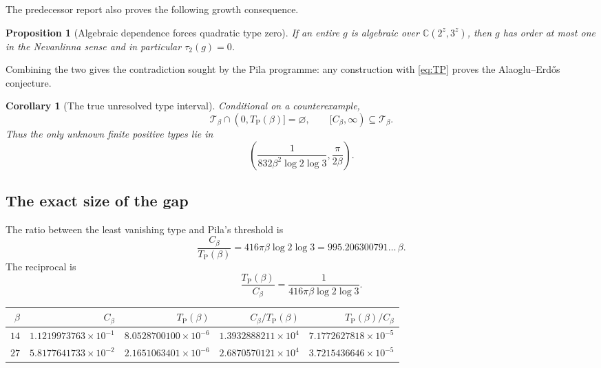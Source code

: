 \documentclass[11pt,oneside]{article}
\newtheorem{proposition}[theorem]{Proposition}
\newtheorem{corollary}[theorem]{Corollary}
\theoremstyle{definition}
\theoremstyle{remark}
\newcommand{\C}{\mathbb C}
\newcommand{\Tclass}{\mathcal T}
\newcommand{\Cbeta}{C_\beta}
\newcommand{\TP}{T_{\mathrm P}(\beta)}
\begin{document}
The predecessor report also proves the following growth consequence.

\begin{proposition}[Algebraic dependence forces quadratic type zero]
\label{prop:algdepzero}
If an entire $g$ is algebraic over $\C(2^z,3^z)$, then $g$ has order at most one in the
Nevanlinna sense and in particular $\tau_2(g)=0$.
\end{proposition}

Combining the two gives the contradiction sought by the Pila programme: any construction
with \eqref{eq:TP} proves the Alaoglu--Erd\H{o}s conjecture.

\begin{corollary}[The true unresolved type interval]
\label{cor:trueinterval}
Conditional on a counterexample,
\begin{equation}
 \Tclass_\beta\cap(0,\TP]=\varnothing,
 \qquad
 [\Cbeta,\infty)\subseteq\Tclass_\beta.
 \label{eq:trueinterval}
\end{equation}
Thus the only unknown finite positive types lie in
\begin{equation}
 \boxed{
 \left(\frac{1}{832\beta^2\log2\log3},
       \frac{\pi}{2\beta}\right).}
 \label{eq:middleinterval}
\end{equation}
\end{corollary}

\subsection{The exact size of the gap}

The ratio between the least vanishing type and Pila's threshold is
\begin{equation}
 \frac{\Cbeta}{\TP}
 =416\pi\beta\log2\log3
 =995.206300791\ldots\,\beta.
 \label{eq:gapratio}
\end{equation}
The reciprocal is
\[
 \frac{\TP}{\Cbeta}
 =\frac1{416\pi\beta\log2\log3}.
\]

\begin{center}
\begin{tabular}{@{}rrrrr@{}}
\toprule
$\beta$ & $\Cbeta$ & $\TP$ & $\Cbeta/\TP$ & $\TP/\Cbeta$\\
\midrule
$14$ & $1.1219973763\times10^{-1}$ & $8.0528700100\times10^{-6}$
     & $1.3932888211\times10^4$ & $7.1772627818\times10^{-5}$\\
$27$ & $5.8177641733\times10^{-2}$ & $2.1651063401\times10^{-6}$
     & $2.6870570121\times10^4$ & $3.7215436646\times10^{-5}$\\
\bottomrule
\end{tabular}
\end{center}
\end{document}
